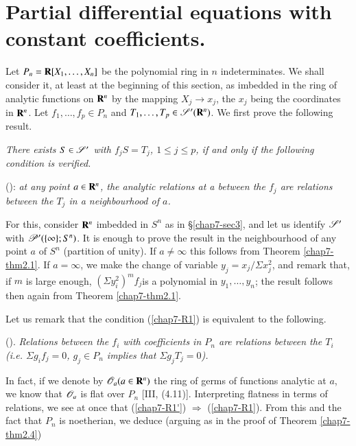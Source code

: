 \section[Partial differential equations with constant coefficients]{Partial differential equations with constant coefficients.}\label{chap7-sec4}

Let $P_{n}=\mathbf{R}[X_{1},\ldots,X_{n}]$ be the polynomial ring in $n$ indeterminates. We shall consider it, at least at the beginning of this section, as imbedded in the ring of analytic functions on $\mathbf{R}^{n}$ by the mapping $X_{j}\to x_{j}$, the $x_{j}$ being the coordinates in $\mathbf{R}^{n}$. Let $f_{1},\ldots,f_{p}\in P_{n}$ and $T_{1},\ldots,T_{p}\in \mathscr{S}'(\mathbf{R}^{n})$. We first prove the following result.

{\em There exists $S\in \mathscr{S}'$ with $f_{j}S=T_{j}$, $1\leq j\leq p$, if and only if the following condition is verified.}

()\label{chap7-R1}: {\em at any point $a\in \mathbf{R}^{n}$, the analytic relations at a between the $f_{j}$ are relations between the $T_{j}$ in a neighbourhood of $a$.}

For this, consider $\mathbf{R}^{n}$ imbedded in $S^{n}$ as in \S\ref{chap7-sec3}, and let us identify $\mathscr{S}'$ with $\mathscr{P}'(\{\infty\};S^{n})$. It is enough to prove the result in the neighbourhood of any point $a$ of $S^{n}$ (partition of unity). If $a\neq \infty$ this follows from Theorem \ref{chap7-thm2.1}. If $a=\infty$, we make the change of variable $y_{j}=x_{j}/\Sigma x^{2}_{j}$, and remark that, if $m$ is large enough, $(\Sigma y^{2}_{i})^{m}f_{j}$\pageoriginale is a polynomial in $y_{1},\ldots,y_{n}$; the result follows then again from Theorem \ref{chap7-thm2.1}.

Let us remark that the condition (\ref{chap7-R1}) is equivalent to the following.

()\label{chap7-R1'}. {\em Relations between the $f_{i}$ with coefficients in $P_{n}$ are relations between the $T_{i}$ ({\em i.e.} $\Sigma g_{i}f_{j}=0$, $g_{j}\in P_{n}$ implies that $\Sigma g_{j}T_{j}=0$).}

In fact, if we denote by $\mathscr{O}_{a}(a\in \mathbf{R}^{n})$ the ring of germs of functions analytic at $a$, we know that $\mathscr{O}_{a}$ is flat over $P_{n}$ [III, (4.11)]. Interpreting flatness in terms of relations, we see at once that (\ref{chap7-R1'}) $\Rightarrow$ (\ref{chap7-R1}). From this and the fact that $P_{n}$ is noetherian, we deduce (arguing as in the proof of Theorem \ref{chap7-thm2.4})

